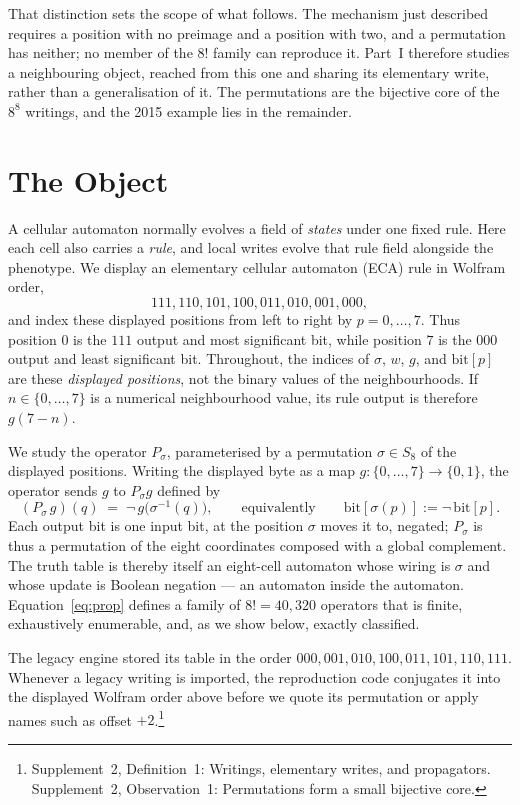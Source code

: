 \documentclass[man,12pt,floatsintext,donotrepeattitle]{apa7}
\newcommand{\sig}{\sigma}
\newcommand{\bit}[1]{\mathrm{bit}[#1]}
\newcommand{\supptheorytext}[2]{Supplement~2, #1: #2.}
\newcommand{\suppnote}[1]{\footnote{#1}}
\begin{document}
That distinction sets the scope of what follows. The mechanism just described
requires a position with no preimage and a position with two, and a permutation
has neither; no member of the $8!$ family can reproduce it. Part~I therefore
studies a neighbouring object, reached from this one and sharing its elementary
write, rather than a generalisation of it. The permutations are the bijective
core of the $8^8$ writings, and the 2015 example lies in the remainder.

\section{The Object}
\label{sec:object}

A cellular automaton normally evolves a field of \emph{states} under one
fixed rule. Here each cell also carries a \emph{rule}, and local writes evolve
that rule field alongside the phenotype. We display an elementary cellular
automaton (ECA) rule in Wolfram order,
\[
111,110,101,100,011,010,001,000,
\]
and index these displayed positions from left to right by $p=0,\ldots,7$.
Thus position $0$ is the $111$ output and most significant bit, while position
$7$ is the $000$ output and least significant bit. Throughout, the indices of
$\sig$, $w$, $g$, and $\bit{p}$ are these \emph{displayed positions}, not the
binary values of the neighbourhoods. If $n\in\{0,\ldots,7\}$ is a numerical
neighbourhood value, its rule output is therefore $g(7-n)$.

We study the operator $P_\sig$, parameterised by a permutation
$\sig\in S_8$ of the displayed positions. Writing the displayed byte as a map
$g\colon\{0,\dots,7\}\to\{0,1\}$, the operator sends $g$ to $P_\sig g$ defined by
\begin{equation}
(P_\sig\, g)(q) \;=\; \lnot\, g\bigl(\sig^{-1}(q)\bigr),
\qquad\text{equivalently}\qquad \bit{\sig(p)} := \lnot\,\bit{p}.
\label{eq:prop}
\end{equation}
Each output bit is one input bit, at the position $\sig$ moves it to, negated;
$P_\sig$ is thus a permutation of the eight coordinates composed with a global
complement. The truth table is thereby itself an eight-cell automaton whose
wiring is $\sig$ and whose update is Boolean negation --- an automaton inside
the automaton. Equation~\eqref{eq:prop} defines a family of $8! = 40{,}320$
operators that is finite, exhaustively enumerable, and, as we show below,
exactly classified.

The legacy engine stored its table in the order
$000,001,010,100,011,101,110,111$. Whenever a legacy writing is imported, the
reproduction code conjugates it into the displayed Wolfram order above before
we quote its permutation or apply names such as offset $+2$.\suppnote{\supptheorytext{Definition~1}{Writings, elementary writes, and propagators} \supptheorytext{Observation~1}{Permutations form a small bijective core}}
\end{document}
